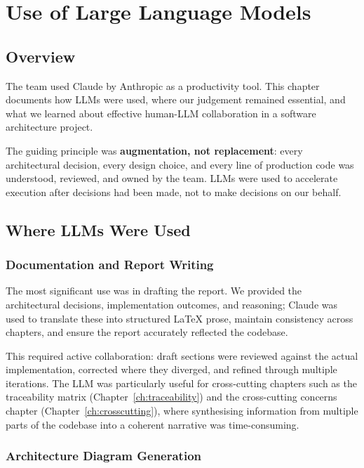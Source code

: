 \chapter{Use of Large Language Models}
\label{ch:llm}

\section{Overview}

The team used Claude by Anthropic as a productivity tool. This chapter documents how LLMs were used, where our judgement remained essential, and what we learned about effective human-LLM collaboration in a software architecture project.

The guiding principle was \textbf{augmentation, not replacement}: every architectural decision, every design choice, and every line of production code was understood, reviewed, and owned by the team. LLMs were used to accelerate execution after decisions had been made, not to make decisions on our behalf.

\section{Where LLMs Were Used}

\subsection{Documentation and Report Writing}

The most significant use was in drafting the report. We provided the architectural decisions, implementation outcomes, and reasoning; Claude was used to translate these into structured LaTeX prose, maintain consistency across chapters, and ensure the report accurately reflected the codebase.

This required active collaboration: draft sections were reviewed against the actual implementation, corrected where they diverged, and refined through multiple iterations. The LLM was particularly useful for cross-cutting chapters such as the traceability matrix (Chapter~\ref{ch:traceability}) and the cross-cutting concerns chapter (Chapter~\ref{ch:crosscutting}), where synthesising information from multiple parts of the codebase into a coherent narrative was time-consuming.

\subsection{Architecture Diagram Generation}

